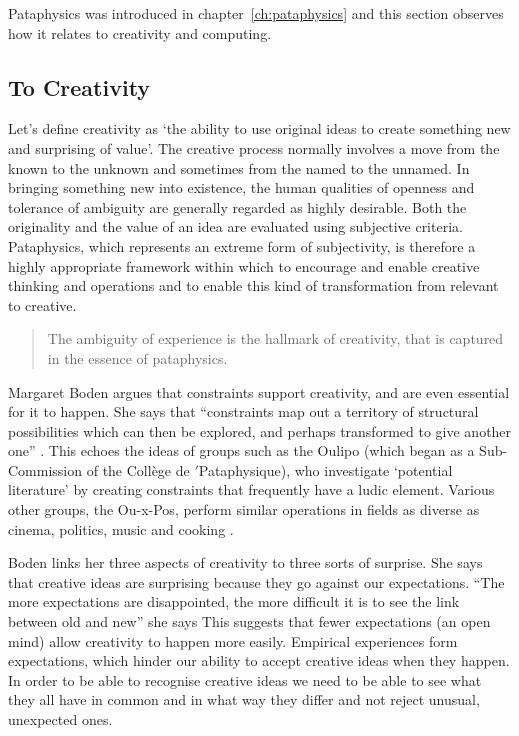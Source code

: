 Pataphysics was introduced in chapter~\ref{ch:pataphysics} and this section observes how it relates to creativity and computing.

\subsection{To Creativity}

Let's define creativity as `the ability to use original ideas to create something new and surprising of value'. The creative process normally involves a move from the known to the unknown and sometimes from the named to the unnamed. In bringing something new into existence, the human qualities of openness and tolerance of ambiguity are generally regarded as highly desirable. Both the originality and the value of an idea are evaluated using subjective criteria. Pataphysics, which represents an extreme form of subjectivity, is therefore a highly appropriate framework within which to encourage and enable creative thinking and operations and to enable this kind of transformation from relevant to creative.

\begin{quotation}
  The ambiguity of experience is the hallmark of creativity, that is captured in the essence of pataphysics. 
\end{quotation}

Margaret Boden argues that constraints support creativity, and are even essential for it to happen. She says that ``constraints map out a territory of structural possibilities which can then be explored, and perhaps transformed to give another one'' \citeyear[p.82]{Boden2003}. This echoes the ideas of groups such as the Oulipo (which began as a Sub-Commission of the Collège de $'$Pataphysique), who investigate `potential literature' by creating constraints that frequently have a ludic element. Various other groups, the Ou-x-Pos, perform similar operations in fields as diverse as cinema, politics, music and cooking \autocite{Motte2007}.

Boden links her three aspects of creativity to three sorts of surprise. She says that creative ideas are surprising because they go against our expectations. ``The more expectations are disappointed, the more difficult it is to see the link between old and new'' she says \citeyear[p.84]{Boden2003} This suggests that fewer expectations (an open mind) allow creativity to happen more easily. Empirical experiences form expectations, which hinder our ability to accept creative ideas when they happen. In order to be able to recognise creative ideas we need to be able to see what they all have in common and in what way they differ and not reject unusual, unexpected ones.

